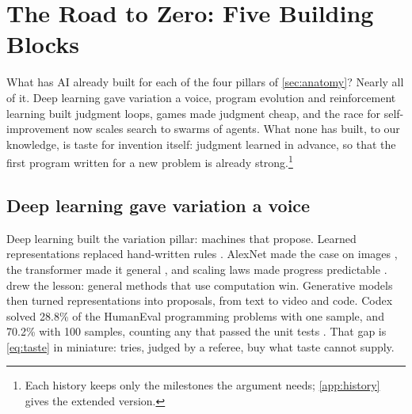 
\section{The Road to Zero: Five Building Blocks}\label{sec:road}

What has AI already built for each of the four pillars of
\cref{sec:anatomy}? Nearly all of it. Deep learning gave variation a voice,
program evolution and reinforcement learning built judgment loops, games
made judgment cheap, and the race for self-improvement now scales search to
swarms of agents. What none has built, to our knowledge, is taste for
invention itself: judgment learned in advance, so that the first program
written for a new problem is already strong.\footnote{Each history keeps
only the milestones the argument needs; \cref{app:history} gives the
extended version.}

\subsection{Deep learning gave variation a voice}\label{sub:road-deep}

Deep learning built the variation pillar: machines that propose. Learned
representations replaced hand-written rules \citep{lecun2015deep}. AlexNet
made the case on images \citep{krizhevsky2012imagenet}, the transformer
made it general \citep{vaswani2017attention}, and scaling laws made progress
predictable \citep{kaplan2020scaling,hoffmann2022chinchilla}.
\citet{sutton2019bitter} drew the lesson: general methods that use
computation win. Generative models then turned representations into
proposals, from text to video \citep{brooks2024sora} and code. Codex solved
28.8\% of the HumanEval programming problems with one sample, and 70.2\%
with 100 samples, counting any that passed the unit tests
\citep{chen2021codex}. That gap is \cref{eq:taste} in miniature: tries,
judged by a referee, buy what taste cannot supply.

